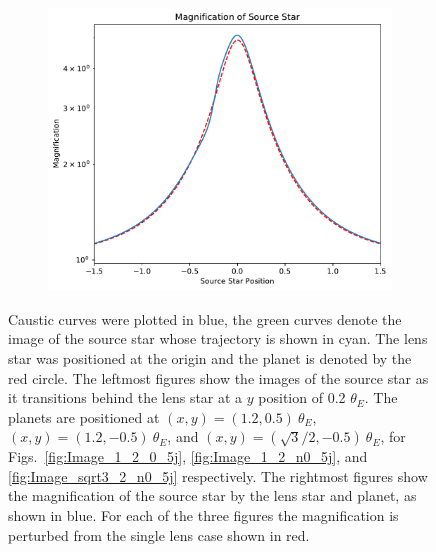 \documentclass{article}
\begin{document}
\begin{figure}[h]
\begin{subfigure}{.5\textwidth}
\begin{minipage}[c]{0.85\textwidth}
  \end{minipage}\hfill
\end{subfigure}%
\begin{subfigure}{.5\textwidth}
  \begin{minipage}{0.1\textwidth}
    \caption{} \label{fig:Magnification_sqrt3_2_-0_5j}
  \end{minipage}\hfill
\begin{minipage}[c]{0.85\textwidth}
    \includegraphics[width=7 cm]{Magnification_x_sqrt3_2_-0_5j.pdf}
  \end{minipage}\hfill
\end{subfigure} %
\captionsetup{justification=centering}
\caption{\label{fig:Image_and_Magnification} Caustic curves were plotted in blue, the green curves denote the image of the source star whose trajectory is shown in cyan. The lens star was positioned at the origin and the planet is denoted by the red circle. The leftmost figures show the images of the source star as it transitions behind the lens star at a $y$ position of 0.2 $\theta_E$. The planets are positioned at ${(x,y) = (1.2,0.5)~\theta_E}$, ${(x,y) = (1.2,-0.5)~\theta_E}$, and ${(x,y) = (\sqrt{3}/2,-0.5)~\theta_E}$, for Figs.~\ref{fig:Image_1_2_0_5j}, \ref{fig:Image_1_2_n0_5j}, and \ref{fig:Image_sqrt3_2_n0_5j} respectively. The rightmost figures show the magnification of the source star by the lens star and planet, as shown in blue. For each of the three figures the magnification is perturbed from the single lens case shown in red.}
\end{figure}
\end{document}
